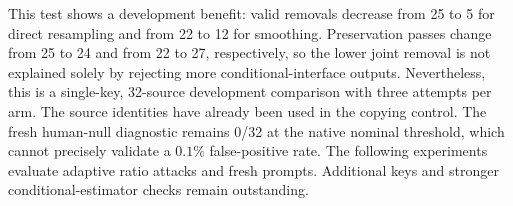 This test shows a development benefit: valid removals decrease from 25 to 5 for direct resampling and from 22 to 12 for smoothing. Preservation passes change from 25 to 24 and from 22 to 27, respectively, so the lower joint removal is not explained solely by rejecting more conditional-interface outputs. Nevertheless, this is a single-key, 32-source development comparison with three attempts per arm. The source identities have already been used in the copying control. The fresh human-null diagnostic remains 0/32 at the native nominal threshold, which cannot precisely validate a $0.1\%$ false-positive rate. The following experiments evaluate adaptive ratio attacks and fresh prompts. Additional keys and stronger conditional-estimator checks remain outstanding.
